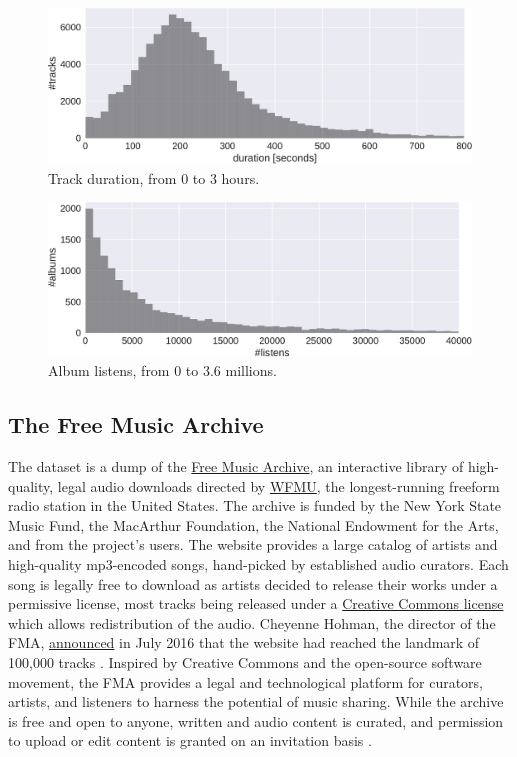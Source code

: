 \documentclass{article}
\begin{document}
\begin{figure}
	\centering
	\includegraphics[width=\linewidth]{duration_distribution.pdf}
	\caption{Track duration, from 0 to 3 hours.}
	\label{fig:duration_distribution}
\end{figure}

\begin{figure}
	\centering
	\includegraphics[width=\linewidth]{listens_distribution.pdf}
	\caption{Album listens, from 0 to 3.6 millions.}
	\label{fig:listens_distribution}
\end{figure}

\subsection{The Free Music Archive}

The dataset is a dump of the \href{https://freemusicarchive.org/}{Free Music Archive}, an interactive library of high-quality, legal audio downloads directed by \href{https://wfmu.org/}{WFMU}, the longest-running freeform radio station in the United States.
The archive is funded by the New York State Music Fund, the MacArthur Foundation, the National Endowment for the Arts, and from the project's users.
The website provides a large catalog of artists and high-quality mp3-encoded songs, hand-picked by established audio curators. Each song is legally free to download as artists decided to release their works under a permissive license, most tracks being released under a \href{https://creativecommons.org/}{Creative Commons license} which allows redistribution of the audio. Cheyenne Hohman, the director of the FMA, \href{http://freemusicarchive.org/member/cheyenne_h/blog/100000_SONGS}{announced} in July 2016 that the website had reached the landmark of 100,000 tracks \cite{art:MossFMA}.
Inspired by Creative Commons and the open-source software movement, the FMA provides a legal and technological platform for curators, artists, and listeners to harness the potential of music sharing. While the archive is free and open to anyone, written and audio content is curated, and permission to upload or edit content is granted on an invitation basis \cite{art:MossFMA}.
\end{document}
